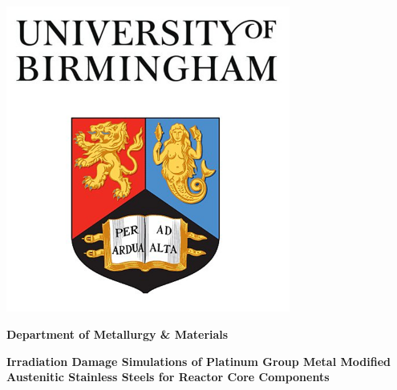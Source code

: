 \begin{titlepage}
  \begin{center}   
    \centerline{\includegraphics[width=0.7\textwidth]{cover/Cover_Art}}    
    
    
    \textbf{Department of Metallurgy \& Materials}   
    
    \vspace*{2.0cm}       
    \Large{}    
    \textbf{Irradiation Damage Simulations of Platinum Group Metal Modified Austenitic Stainless Steels for Reactor Core Components}
    \vspace{0.8cm}   
    \normalsize{}
    
    \vfill        
    
  \end{center}
\end{titlepage}

\afterpage{\blankpage}